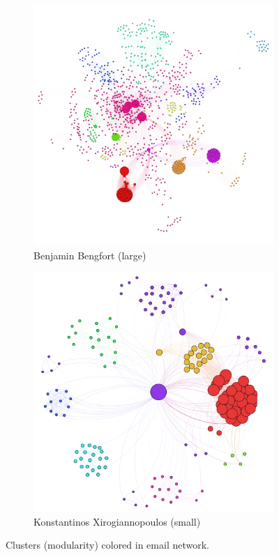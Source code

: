 \documentclass[11pt,letterpaper]{article}
\begin{document}
\begin{figure}[h]
	\centering
	\begin{subfigure}{0.49\textwidth}
		\centering
		\includegraphics[width=\textwidth]{figures/benjamin_cluster.png}
		\caption{\textsf{Benjamin Bengfort (large)}}
        \label{fig:benjamin_cluster}
	\end{subfigure} \hfill
	\begin{subfigure}{0.49\textwidth}
		\centering
		\includegraphics[width=\textwidth]{figures/kostas_cluster.png}
		\caption{\textsf{Konstantinos Xirogiannopoulos (small)}}
        \label{fig:kostas_cluster}
	\end{subfigure}
    \caption{\textsf{Clusters (modularity) colored in email network.}}
    \label{fig:cluster}
\end{figure}
\end{document}
